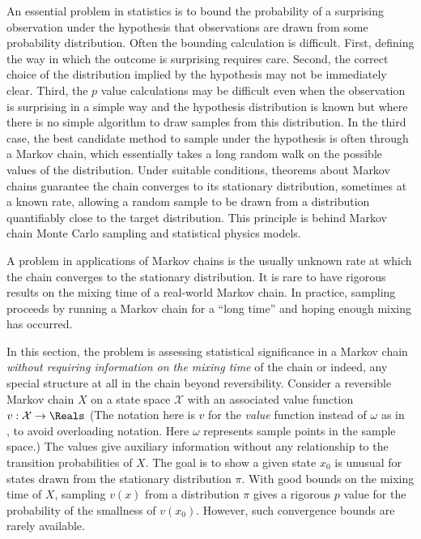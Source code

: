 \documentclass[12pt]{article}
\begin{document}
An essential problem in statistics is to bound the probability of a
surprising observation under the hypothesis that observations are drawn
from some probability distribution.  Often the bounding calculation is
difficult.  First, defining the way in which the outcome is surprising
requires care.  Second, the correct choice of the distribution implied
by the hypothesis may not be immediately clear.  Third, the \( p \)
value calculations may be difficult even when the observation is
surprising in a simple way and the hypothesis distribution is known but
where there is no simple algorithm to draw samples from this
distribution.  In the third case, the best candidate method to sample
under the hypothesis is often through a Markov chain, which essentially
takes a long random walk on the possible values of the distribution.
Under suitable conditions, theorems about Markov chains guarantee the
chain converges to its stationary distribution, sometimes at a known
rate, allowing a random sample to be drawn from a distribution
quantifiably close to the target distribution.  This principle is behind
Markov chain Monte Carlo sampling and statistical physics models.

A problem in applications of Markov chains is the usually unknown rate
at which the chain converges to the stationary distribution.  It is rare
to have rigorous results on the mixing time of a real-world Markov
chain.  In practice, sampling proceeds by running a Markov chain for a
``long time'' and hoping enough mixing has occurred.

In this section, the problem is assessing statistical significance in a
Markov chain \emph{without requiring information on the mixing time} of
the chain or indeed, any special structure at all in the chain beyond
reversibility.  Consider a reversible Markov chain \( X \) on a state
space \( \mathcal{X} \) with an associated value function \( v :
\mathcal{X} \to \Reals \) (The notation here is \( v \) for the \emph{value}
function instead of \( \omega \) as in~%
\cite{Chikina2860}, to avoid overloading notation.  Here \( \omega \)
represents sample points in the sample space.) The values give auxiliary
information without any relationship to the transition probabilities of \(
X \).  The goal is to show a given state \( x_0 \) is unusual for states
drawn from the stationary distribution \( \pi \).  With good bounds on
the mixing time of \( X \), sampling \( v(x) \) from a distribution \(
\pi \) gives a rigorous \( p \) value for the probability of the
smallness of \( v(x_0) \).  However, such convergence bounds are rarely
available.
\end{document}
